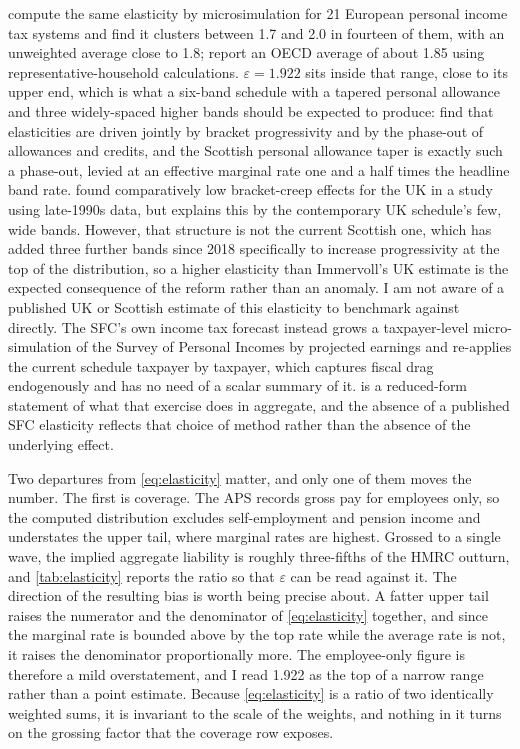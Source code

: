 \citet{garcia2026} compute the same elasticity by microsimulation for 21 European personal income tax systems and find it clusters between 1.7 and 2.0 in fourteen of them, with an unweighted average close to 1.8; \citet{price2015} report an OECD average of about 1.85 using representative-household calculations. $\varepsilon = 1.922$ sits inside that range, close to its upper end, which is what a six-band schedule with a tapered personal allowance and three widely-spaced higher bands should be expected to produce: \citet{garcia2026} find that elasticities are driven jointly by bracket progressivity and by the phase-out of allowances and credits, and the Scottish personal allowance taper is exactly such a phase-out, levied at an effective marginal rate one and a half times the headline band rate. \citet{immervoll2005} found comparatively low bracket-creep effects for the UK in a study using late-1990s data, but explains this by the contemporary UK schedule's few, wide bands. However, that structure is not the current Scottish one, which has added three further bands since 2018 specifically to increase progressivity at the top of the distribution, so a higher elasticity than Immervoll's UK estimate is the expected consequence of the reform rather than an anomaly. I am not aware of a published UK or Scottish estimate of this elasticity to benchmark against directly. The SFC's own income tax forecast instead grows a taxpayer-level micro-simulation of the Survey of Personal Incomes by projected earnings and re-applies the current schedule taxpayer by taxpayer, which captures fiscal drag endogenously and has no need of a scalar summary of it.  is a reduced-form statement of what that exercise does in aggregate, and the absence of a published SFC elasticity reflects that choice of method rather than the absence of the underlying effect.

Two departures from \cref{eq:elasticity} matter, and only one of them moves the number. The first is coverage. The APS records gross pay for employees only, so the computed distribution excludes self-employment and pension income and understates the upper tail, where marginal rates are highest. Grossed to a single wave, the implied aggregate liability is roughly three-fifths of the HMRC outturn, and \cref{tab:elasticity} reports the ratio so that $\varepsilon$ can be read against it. The direction of the resulting bias is worth being precise about. A fatter upper tail raises the numerator and the denominator of \cref{eq:elasticity} together, and since the marginal rate is bounded above by the top rate while the average rate is not, it raises the denominator proportionally more. The employee-only figure is therefore a mild overstatement, and I read 1.922 as the top of a narrow range rather than a point estimate. Because \cref{eq:elasticity} is a ratio of two identically weighted sums, it is invariant to the scale of the weights, and nothing in it turns on the grossing factor that the coverage row exposes.

